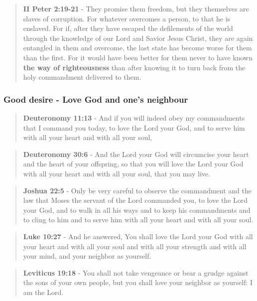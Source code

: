 \documentclass[11pt]{article}
\begin{document}
\begin{quote}
\textbf{II Peter 2:19-21} - They promise them freedom, but they themselves are slaves of corruption. For whatever overcomes a person, to that he is enslaved. For if, after they have escaped the defilements of the world through the knowledge of our Lord and Savior Jesus Christ, they are again entangled in them and overcome, the last state has become worse for them than the first. For it would have been better for them never to have known \textbf{the way of righteousness} than after knowing it to turn back from the holy commandment delivered to them.
\end{quote}

\subsubsection{Good desire - Love God and one's neighbour}
\label{sec:orgc44dbf2}
\begin{quote}
\textbf{Deuteronomy 11:13} - And if you will indeed obey my commandments that I command you today, to love the Lord your God, and to serve him with all your heart and with all your soul,
\end{quote}

\begin{quote}
\textbf{Deuteronomy 30:6} - And the Lord your God will circumcise your heart and the heart of your offspring, so that you will love the Lord your God with all your heart and with all your soul, that you may live.
\end{quote}

\begin{quote}
\textbf{Joshua 22:5} - Only be very careful to observe the commandment and the law that Moses the servant of the Lord commanded you, to love the Lord your God, and to walk in all his ways and to keep his commandments and to cling to him and to serve him with all your heart and with all your soul.
\end{quote}

\begin{quote}
\textbf{Luke 10:27} - And he answered, You shall love the Lord your God with all your heart and with all your soul and with all your strength and with all your mind, and your neighbor as yourself.
\end{quote}

\begin{quote}
\textbf{Leviticus 19:18} - You shall not take vengeance or bear a grudge against the sons of your own people, but you shall love your neighbor as yourself: I am the Lord.
\end{quote}
\end{document}
